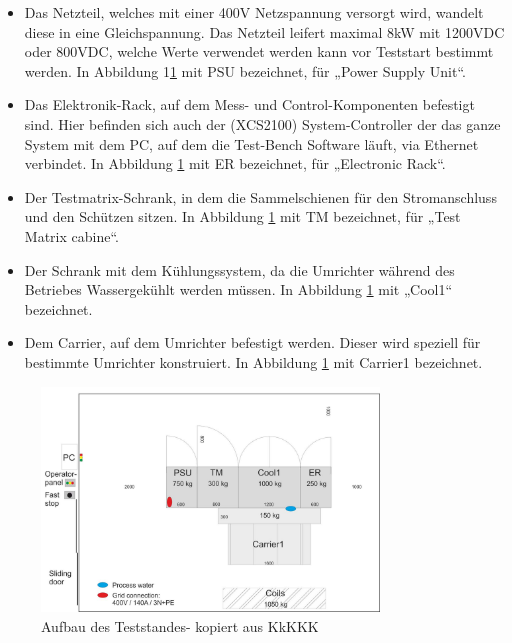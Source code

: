 \begin{itemize}
\item Das Netzteil, welches mit einer 400V Netzspannung versorgt wird, wandelt diese in eine Gleichspannung. Das Netzteil leifert maximal 8kW mit 1200VDC oder 800VDC, welche Werte verwendet werden kann vor Teststart bestimmt werden. In Abbildung 1\ref{fig:1. Aufbau des Teststandes} mit PSU bezeichnet, für „Power Supply Unit“.


\item Das Elektronik-Rack, auf dem Mess- und Control-Komponenten befestigt sind. Hier befinden sich auch der (XCS2100) System-Controller der das ganze System mit dem PC, auf dem die Test-Bench Software läuft, via Ethernet verbindet. In Abbildung \ref{fig:1. Aufbau des Teststandes} mit ER bezeichnet, für „Electronic Rack“.


\item Der Testmatrix-Schrank, in dem die Sammelschienen für den Stromanschluss und den Schützen sitzen. In Abbildung \ref{fig:1. Aufbau des Teststandes} mit TM bezeichnet, für „Test Matrix cabine“.


\item Der Schrank mit dem Kühlungssystem, da die Umrichter während des Betriebes Wassergekühlt werden müssen. In Abbildung \ref{fig:1. Aufbau des Teststandes} mit „Cool1“ bezeichnet.


\item Dem Carrier, auf dem Umrichter befestigt werden. Dieser wird speziell für bestimmte Umrichter konstruiert. In Abbildung \ref{fig:1. Aufbau des Teststandes} mit Carrier1 bezeichnet.

\end{itemize}

\begin{figure}[h]
    \centering
    \includegraphics[width=0.8\textwidth]{Grafiken/Test Cabin.jpg}
    \caption{Aufbau des Teststandes- kopiert aus KkKKK}
    \label{fig:1. Aufbau des Teststandes}
\end{figure}

